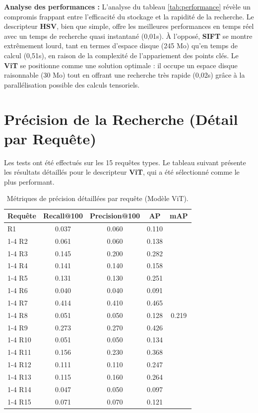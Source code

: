 \documentclass[a4paper,12pt]{report}%
\begin{document}
\noindent \textbf{Analyse des performances :}
L'analyse du tableau \ref{tab:performance} révèle un compromis frappant entre l'efficacité du stockage et la rapidité de la recherche. Le descripteur \textbf{HSV}, bien que simple, offre les meilleures performances en temps réel avec un temps de recherche quasi instantané (0,01s). À l'opposé, \textbf{SIFT} se montre extrêmement lourd, tant en termes d'espace disque (245 Mo) qu'en temps de calcul (0,51s), en raison de la complexité de l'appariement des points clés. Le \textbf{ViT} se positionne comme une solution optimale : il occupe un espace disque raisonnable (30 Mo) tout en offrant une recherche très rapide (0,02s) grâce à la parallélisation possible des calculs tensoriels.

\section{Précision de la Recherche (Détail par Requête)}
Les tests ont été effectués sur les 15 requêtes types. Le tableau suivant présente les résultats détaillés pour le descripteur \textbf{ViT}, qui a été sélectionné comme le plus performant.

\begin{table}[H]
    \centering
    \begin{tabular}{|l|c|c|c|c|}
    \hline
    \textbf{Requête} & \textbf{Recall@100} & \textbf{Precision@100} & \textbf{AP} & \textbf{mAP} \\ \hline
    R1 & 0.037 & 0.060 & 0.110 & \multirow{15}{*}{0.219} \\ \cline{1-4}
    R2 & 0.061 & 0.060 & 0.138 & \\ \cline{1-4}
    R3 & 0.145 & 0.200 & 0.282 & \\ \cline{1-4}
    R4 & 0.141 & 0.140 & 0.158 & \\ \cline{1-4}
    R5 & 0.131 & 0.130 & 0.251 & \\ \cline{1-4}
    R6 & 0.040 & 0.040 & 0.091 & \\ \cline{1-4}
    R7 & 0.414 & 0.410 & 0.465 & \\ \cline{1-4}
    R8 & 0.051 & 0.050 & 0.128 & \\ \cline{1-4}
    R9 & 0.273 & 0.270 & 0.426 & \\ \cline{1-4}
    R10 & 0.051 & 0.050 & 0.134 & \\ \cline{1-4}
    R11 & 0.156 & 0.230 & 0.368 & \\ \cline{1-4}
    R12 & 0.111 & 0.110 & 0.247 & \\ \cline{1-4}
    R13 & 0.115 & 0.160 & 0.264 & \\ \cline{1-4}
    R14 & 0.047 & 0.050 & 0.097 & \\ \cline{1-4}
    R15 & 0.071 & 0.070 & 0.121 & 0.219 \\ \hline
    \end{tabular}
    \caption{Métriques de précision détaillées par requête (Modèle ViT).}
    \label{tab:precision_detail}
\end{table}
\end{document}
